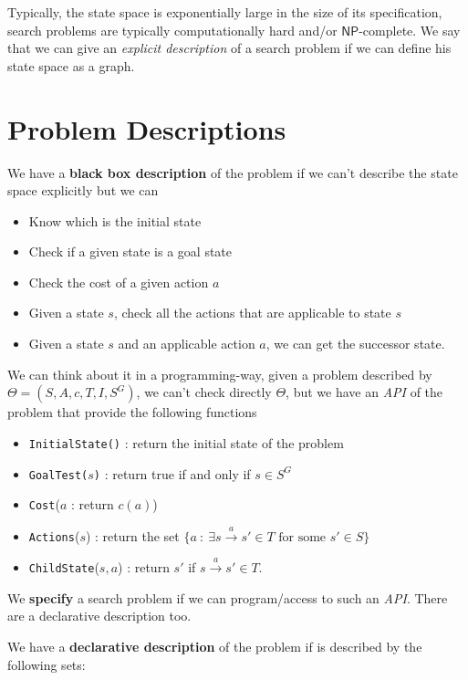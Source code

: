 \documentclass[10pt, letterpaper]{report}
\begin{document}
Typically, the state space is exponentially large in the size of its specification, search problems are typically computationally hard and/or $\mathsf{NP}$-complete. We say that we can give an \textit{explicit description} of a search problem if we can define his state space as a graph.
\section{Problem Descriptions}
\begin{definition}
    We have a \textbf{black box description} of the problem if we can't describe the state space explicitly but we can\begin{itemize}
        \item Know which is the initial state
        \item Check if a given state is a goal state
        \item Check the cost of a given action $a$
        \item Given a state $s$, check all the actions that are applicable to state $s$
        \item Given a state $s$ and an applicable action $a$, we can get the successor state.
    \end{itemize}
\end{definition}
We can think about it in a programming-way, given a problem described by $\Theta=(S,A,c,T,I,S^G)$, we can't check directly $\Theta$, but we have an \textit{API} of the problem that provide the following functions \begin{itemize}
    \item \texttt{InitialState()} : return the initial state of the problem
    \item \texttt{GoalTest($s$)} : return true if and only if $s\in S^G$
    \item \texttt{Cost}($a$ : return $c(a)$)
    \item \texttt{Actions}($s$) : return the set $\{ a \ : \ \exists  s\xrightarrow{a} s'\in T \text{ for some }s'\in S\}$
    \item \texttt{ChildState}($s,a$) : return $s'$ if $s\xrightarrow{a} s'\in T$.
\end{itemize}
We \textbf{specify} a search problem if we can program/access to such an \textit{API}. There are a declarative description too.
\begin{definition}
    We have a \textbf{declarative description} of the problem if is described by the following sets:
\end{definition}
\end{document}
